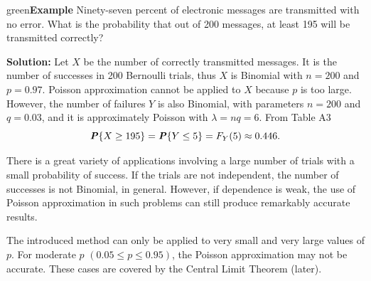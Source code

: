 \documentclass{article}
\newenvironment{example}[1]{\begin{mybox}{green}{\textbf{Example #1}}}{\end{mybox}}
\newcommand{\prob}[1]{\textbf{\textit{P}}\{#1\}}
\begin{document}
\begin{example}{}
Ninety-seven percent of electronic messages are transmitted with no error. What is the probability that out of 200 messages, at least 195 will be transmitted correctly?

\textbf{Solution:}
Let $X$ be the number of correctly transmitted messages. It is the number of successes in 200 Bernoulli trials, thus $X$ is Binomial with $n = 200$ and $p = 0.97$. Poisson approximation cannot be applied to $X$ because $p$ is too large. However, the number of failures $Y$ is also Binomial, with parameters $n = 200$ and $q = 0.03$, and it is approximately Poisson with $\lambda = nq = 6$. From Table A3
\begin{equation*}
    \prob{X \geq 195} = \prob{Y \leq 5} = F_Y (5) \approx 0.446.
\end{equation*}
\end{example}

There is a great variety of applications involving a large number of trials with a small probability of success. If the trials are not independent, the number of successes is not Binomial, in general. However, if dependence is weak, the use of Poisson approximation in such problems can still produce remarkably accurate results.


The introduced method can only be applied to very small and very large values of $p$. For moderate $p$ $(0.05 \leq p \leq 0.95)$, the Poisson approximation may not be accurate. These cases are covered by the Central Limit Theorem (later).
\end{document}

